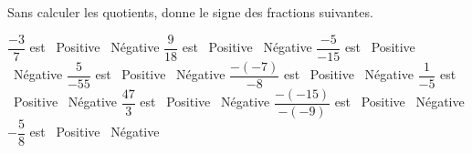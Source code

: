 %
%
Sans calculer les quotients, donne le signe des fractions suivantes.
  \begin{tasks}
    \task $\dfrac{- 3}{7}$ est \qquad \faSquareO~Positive \quad\faSquareO~Négative
    \task $\dfrac{9}{18}$ est \qquad \faSquareO~Positive \quad\faSquareO~Négative
    \task $\dfrac{- 5}{- 15}$ est \qquad \faSquareO~Positive \quad\faSquareO~Négative
    \task $\dfrac{5}{- 55}$ est \qquad \faSquareO~Positive \quad\faSquareO~Négative
    \task $\dfrac{- ( - 7)}{- 8}$ est \qquad \faSquareO~Positive \quad\faSquareO~Négative
    \task $\dfrac{1}{- 5}$ est \qquad \faSquareO~Positive \quad\faSquareO~Négative
    \task $\dfrac{47}{3}$ est \qquad \faSquareO~Positive \quad\faSquareO~Négative
    \task $\dfrac{- ( - 15)}{- ( - 9)}$ est \qquad \faSquareO~Positive \quad\faSquareO~Négative
    \task $- \dfrac{5}{8}$ est \qquad \faSquareO~Positive \quad\faSquareO~Négative
  \end{tasks}
